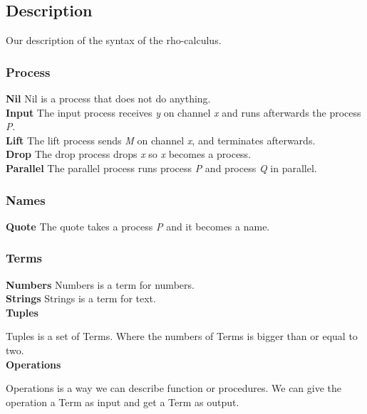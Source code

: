 \subsection{Description}
Our description of the syntax of the rho-calculus.

\subsubsection{Process}
\textbf{Nil}
Nil is a process that does not do anything.
\\
\textbf{Input}
The input process receives \textit{y} on channel \textit{x} and runs afterwards the process \textit{P}.
\\
\textbf{Lift}
The lift process sends \textit{M} on channel \textit{x}, and terminates afterwards.
\\
\textbf{Drop}
The drop process drops \textit{x} so \textit{x} becomes a process.
\\
\textbf{Parallel}
The parallel process runs process \textit{P} and process \textit{Q} in parallel.

\subsubsection{Names}
\textbf{Quote}
The quote takes a process \textit{P} and it becomes a name.

\subsubsection{Terms}
\textbf{Numbers} 
Numbers is a term for numbers.
\\
\textbf{Strings}
Strings is a term for text.
\\
\textbf{Tuples}

Tuples is a set of Terms. Where the numbers of Terms is bigger than or equal to two.
\\
\textbf{Operations}

Operations is a way we can describe function or procedures. We can give the operation a Term as input and get a Term as output.